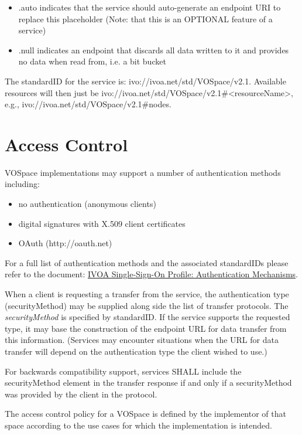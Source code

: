 \documentclass[11pt,a4paper]{ivoa}
\begin{document}
\begin{itemize}
    \item .auto indicates that the service should auto-generate an endpoint URI to replace this placeholder (Note: that this is an OPTIONAL feature of a service)
    \item .null indicates an endpoint that discards all data written to it and provides no data when read from, i.e. a bit bucket
\end{itemize}

The standardID for the service is: ivo://ivoa.net/std/VOSpace/v2.1. Available resources will then just be ivo://ivoa.net/std/VOSpace/v2.1\#<resourceName>, e.g., ivo://ivoa.net/std/VOSpace/v2.1\#nodes.

\section{Access Control}
\label{sec:access control}
VOSpace implementations may support a number of authentication methods including:

\begin{itemize}
    \item no authentication (anonymous clients)
    \item digital signatures with X.509 client certificates
    \item OAuth (http://oauth.net)
\end{itemize}

For a full list of authentication methods and the associated standardIDs please refer to the document: \href{http://www.ivoa.net/documents/latest/SSOAuthMech.html}{IVOA Single-Sign-On Profile: Authentication Mechanisms}. 	

When a client is requesting a transfer from the service, the authentication type (securityMethod) may be supplied along side the list of transfer protocols. The \emph{securityMethod} is specified by standardID.  If the service supports the requested type, it may base the construction of the endpoint URL for data transfer from this information.  (Services may encounter situations when the URL for data transfer will depend on the authentication type the client wished to use.)

For backwards compatibility support, services SHALL include the securityMethod element in the transfer response if and only if a securityMethod was provided by the client in the protocol.

The access control policy for a VOSpace is defined by the implementor of that space according to the use cases for which the implementation is intended.
\end{document}
